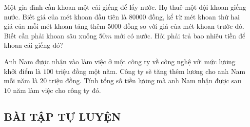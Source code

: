 \begin{vd}%
	Một gia đình cần khoan một cái giếng để lấy nước. Họ thuê một đội khoan giếng nước. Biết giá của mét khoan đầu tiên là $80000$ đồng, kể từ mét khoan thứ hai giá của mỗi mét khoan tăng thêm $5000$ đồng so với giá của mét khoan trước đó. Biết cần phải khoan sâu xuống $50m$ mới có nước. Hỏi phải trả bao nhiêu tiền để khoan cái giếng đó?
\end{vd}

\begin{vd}
	Anh Nam được nhận vào làm việc ở một công ty về công nghệ với mức lương khởi điểm là $ 100 $ triệu đồng một năm. Công ty sẽ tăng thêm lương cho anh Nam mỗi năm là $ 20 $ triệu đồng. Tính tổng số tiền lương mà anh Nam nhận được sau $ 10 $ năm làm việc cho công ty đó.
\end{vd}

\subsection{BÀI TẬP TỰ LUYỆN}


